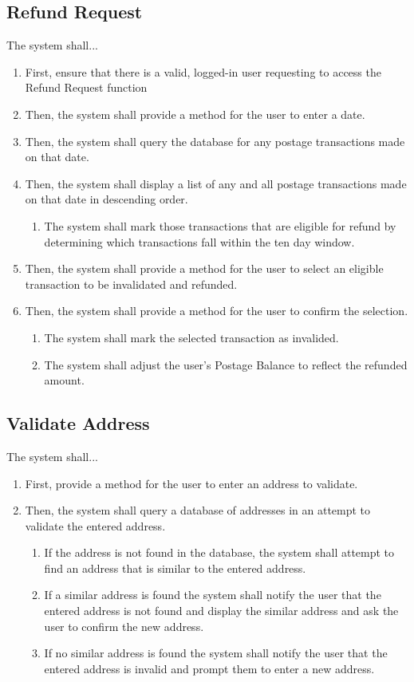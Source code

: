 \documentclass{scrreprt}
\begin{document}
\subsection{Refund Request}

The system shall...

\begin{enumerate}
\item First, ensure that there is a valid, logged-in user requesting to access
the Refund Request function
\item Then, the system shall provide a method for the user to enter a date.
\item Then, the system shall query the database for any postage transactions
made on that date.
\item Then, the system shall display a list of any and all postage transactions
made on that date in descending order.
\begin{enumerate}
\item The system shall mark those transactions that are eligible for refund by
determining which transactions fall within the ten day window.
\end{enumerate}
\item Then, the system shall provide a method for the user to select an
eligible transaction to be invalidated and refunded.
\item Then, the system shall provide a method for the user to confirm the
selection.
\begin{enumerate}
\item The system shall mark the selected transaction as invalided.
\item The system shall adjust the user’s Postage Balance to reflect the
refunded amount.
\end{enumerate}
\end{enumerate}

\subsection{Validate Address}

The system shall...

\begin{enumerate}
\item First, provide a method for the user to enter an address to validate.
\item Then, the system shall query a database of addresses in an attempt to
validate the entered address.
\begin{enumerate}
\item If the address is not found in the database, the system shall attempt to
find an address that is similar to the entered address.
\item If a similar address is found the system shall notify the user that the
entered address is not found and display the similar address and ask the user
to confirm the new address.
\item If no similar address is found the system shall notify the user that the
entered address is invalid and prompt them to enter a new address.
\end{enumerate}
\end{enumerate}
\end{document}
